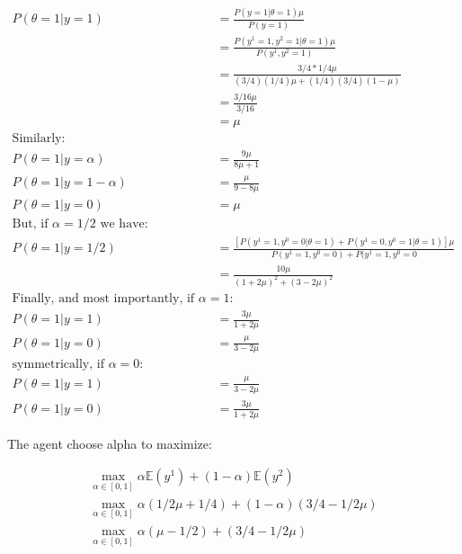 \documentclass{article}
\begin{document}
\begin{equation}
\begin{split}
P(\theta = 1 | y = 1) & = \frac{P(y = 1| \theta = 1) \mu}{P(y = 1)} \\
                      & = \frac{P(y^1 = 1, y^2 = 1 | \theta = 1)\mu}{P(y^1, y^2=1)} \\
                      & = \frac{3/4*1/4\mu}{(3/4)(1/4)\mu + (1/4)(3/4)(1 - \mu)} \\
                      & = \frac{3/16\mu}{3/16} \\
                      & = \mu \\
\text{Similarly:}     & \\
P(\theta = 1|y=\alpha)& = \frac{9\mu}{8\mu + 1} \\
P(\theta=1|y=1-\alpha)& = \frac{\mu}{9 - 8\mu} \\
P(\theta = 1| y = 0)  & = \mu \\
\text{But, if $\alpha = 1/2$ we have:} \\
P(\theta = 1|y = 1/2) & = \frac{[P(y^1 = 1, y^0 = 0 | \theta = 1) +
                                P(y^1 = 0, y^0 = 1 | \theta = 1)]\mu}
                               {P(y^1 = 1, y^0 = 0) + P(y^1 = 1, y^0 = 0} \\
                      & = \frac{10\mu}{(1 + 2\mu)^2 + (3 - 2\mu)^2} \\
\text{Finally, and most importantly, if $\alpha = 1$: } & \\
P(\theta = 1|y = 1)   & = \frac{3\mu}{1 + 2\mu} \\
P(\theta = 1|y = 0)   & = \frac{\mu}{3 - 2\mu} \\
\text{symmetrically, if $\alpha = 0$: } & \\
P(\theta = 1|y = 1)   & = \frac{\mu}{3 - 2\mu} \\
P(\theta = 1|y = 0)   & = \frac{3\mu}{1 + 2\mu}
\end{split}
\end{equation}

The agent choose alpha to maximize:

\begin{equation}
\begin{split}
  \max_{\alpha \in [0,1]} \alpha\mathbb{E}(y^1) + (1 - \alpha)\mathbb{E}(y^2) \\
  \max_{\alpha \in [0,1]} \alpha(1/2\mu + 1/4) + (1 - \alpha)(3/4 - 1/2\mu) \\
  \max_{\alpha \in [0,1]} \alpha(\mu - 1/2) + (3/4 - 1/2\mu)
\end{split}
\end{equation}
\end{document}
